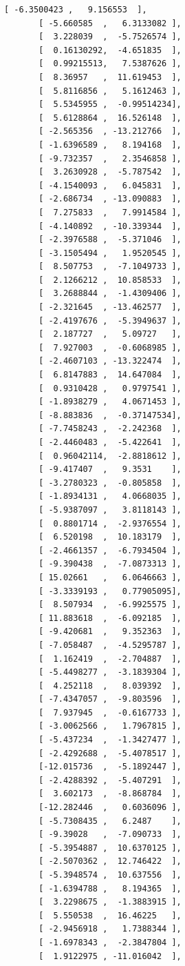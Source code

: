 \documentclass[11pt]{article}
\begin{document}
\begin{tcolorbox}[breakable, size=fbox, boxrule=.5pt, pad at break*=1mm, opacityfill=0]
\begin{Verbatim}[commandchars=\\\{\}]
       [ -6.3500423 ,   9.156553  ],
       [ -5.660585  ,   6.3133082 ],
       [  3.228039  ,  -5.7526574 ],
       [  0.16130292,  -4.651835  ],
       [  0.99215513,   7.5387626 ],
       [  8.36957   ,  11.619453  ],
       [  5.8116856 ,   5.1612463 ],
       [  5.5345955 ,  -0.99514234],
       [  5.6128864 ,  16.526148  ],
       [ -2.565356  , -13.212766  ],
       [ -1.6396589 ,   8.194168  ],
       [ -9.732357  ,   2.3546858 ],
       [  3.2630928 ,  -5.787542  ],
       [ -4.1540093 ,   6.045831  ],
       [ -2.686734  , -13.090883  ],
       [  7.275833  ,   7.9914584 ],
       [ -4.140892  , -10.339344  ],
       [ -2.3976588 ,  -5.371046  ],
       [ -3.1505494 ,   1.9520545 ],
       [  8.507753  ,  -7.1049733 ],
       [  2.1266212 ,  10.858533  ],
       [  3.2688844 ,  -1.4309406 ],
       [ -2.321645  , -13.462577  ],
       [ -2.4197676 ,  -5.3949637 ],
       [  2.187727  ,   5.09727   ],
       [  7.927003  ,  -0.6068985 ],
       [ -2.4607103 , -13.322474  ],
       [  6.8147883 ,  14.647084  ],
       [  0.9310428 ,   0.9797541 ],
       [ -1.8938279 ,   4.0671453 ],
       [ -8.883836  ,  -0.37147534],
       [ -7.7458243 ,  -2.242368  ],
       [ -2.4460483 ,  -5.422641  ],
       [  0.96042114,  -2.8818612 ],
       [ -9.417407  ,   9.3531    ],
       [ -3.2780323 ,  -0.805858  ],
       [ -1.8934131 ,   4.0668035 ],
       [ -5.9387097 ,   3.8118143 ],
       [  0.8801714 ,  -2.9376554 ],
       [  6.520198  ,  10.183179  ],
       [ -2.4661357 ,  -6.7934504 ],
       [ -9.390438  ,  -7.0873313 ],
       [ 15.02661   ,   6.0646663 ],
       [ -3.3339193 ,   0.77905095],
       [  8.507934  ,  -6.9925575 ],
       [ 11.883618  ,  -6.092185  ],
       [ -9.420681  ,   9.352363  ],
       [ -7.058487  ,  -4.5295787 ],
       [  1.162419  ,  -2.704887  ],
       [ -5.4498277 ,  -3.1839304 ],
       [  4.252118  ,   8.039392  ],
       [ -7.4347057 ,  -9.803596  ],
       [  7.937945  ,  -0.6167733 ],
       [ -3.0062566 ,   1.7967815 ],
       [ -5.437234  ,  -1.3427477 ],
       [ -2.4292688 ,  -5.4078517 ],
       [-12.015736  ,  -5.1892447 ],
       [ -2.4288392 ,  -5.407291  ],
       [  3.602173  ,  -8.868784  ],
       [-12.282446  ,   0.6036096 ],
       [ -5.7308435 ,   6.2487    ],
       [ -9.39028   ,  -7.090733  ],
       [ -5.3954887 ,  10.6370125 ],
       [ -2.5070362 ,  12.746422  ],
       [ -5.3948574 ,  10.637556  ],
       [ -1.6394788 ,   8.194365  ],
       [  3.2298675 ,  -1.3883915 ],
       [  5.550538  ,  16.46225   ],
       [ -2.9456918 ,   1.7388344 ],
       [ -1.6978343 ,  -2.3847804 ],
       [  1.9122975 , -11.016042  ],

\end{Verbatim}
\end{tcolorbox}
\end{document}
